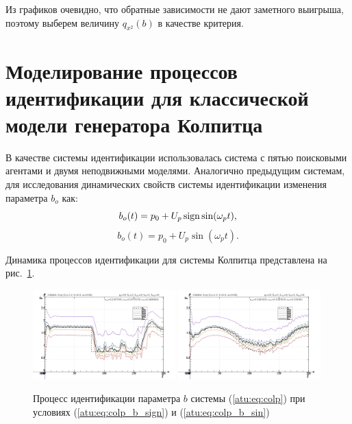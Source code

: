 Из графиков очевидно, что
обратные зависимости не дают заметного выигрыша, поэтому выберем
величину $ q_{x^2}(b) $ в качестве критерия.


\section{Моделирование процессов идентификации для классической модели генератора Колпитца} %

В качестве системы идентификации использовалась система с пятью поисковыми агентами и
двумя неподвижными моделями. Аналогично предыдущим системам,
для исследования динамических свойств системы идентификации
изменения параметра $b_o$ как:
%
\begin{equation}
 b_o(t) = p_0 + U_p \operatorname*{sign} \sin( \omega_p t ),
  \label{atu:eq:colp_b_sign}
\end{equation}
%
\begin{equation}
 b_o(t) = p_0 + U_p \sin( \omega_p t ).
  \label{atu:eq:colp_b_sin}
\end{equation}

Динамика процессов идентификации для системы Колпитца представлена на рис.~\ref{atu:f:colp_id}.

\begin{figure}[htb!]
\centerline{
  \includegraphics[width=0.49\textwidth]{p/mod/colp_m5p-pl_n_sign.png}
  \includegraphics[width=0.49\textwidth]{p/mod/colp_m5p-pl_n_sin.png}
}
\caption{Процесс идентификации параметра $b$ системы (\ref{atu:eq:colp})
  при условиях (\ref{atu:eq:colp_b_sign}) и (\ref{atu:eq:colp_b_sin})
}
\label{atu:f:colp_id}
\end{figure}

